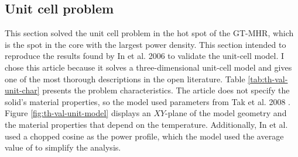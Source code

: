 \subsection{Unit cell problem}
\label{sec:unitcell}

This section solved the unit cell problem in the hot spot of the GT-MHR, which is the spot in the core with the largest power density.
This section intended to reproduce the results found by In et al. 2006 \cite{in_three-dimensional_2006} to validate the unit-cell model.
I chose this article because it solves a three-dimensional unit-cell model and gives one of the most thorough descriptions in the open literature.
Table \ref{tab:th-val-unit-char} presents the problem characteristics.
The article does not specify the solid's material properties, so the model used parameters from Tak et al. 2008 \cite{tak_numerical_2008}.
Figure \ref{fig:th-val-unit-model} displays an $XY$-plane of the model geometry and the material properties that depend on the temperature.
Additionally, In et al. used a chopped cosine as the power profile, which the model used the average value of to simplify the analysis.


